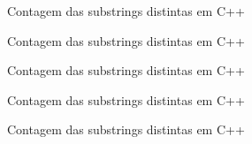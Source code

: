 

\begin{frame}[fragile]{Contagem das substrings distintas em C++}
\end{frame}

\begin{frame}[fragile]{Contagem das substrings distintas em C++}
\end{frame}

\begin{frame}[fragile]{Contagem das substrings distintas em C++}
\end{frame}

\begin{frame}[fragile]{Contagem das substrings distintas em C++}
\end{frame}

\begin{frame}[fragile]{Contagem das substrings distintas em C++}
\end{frame}


